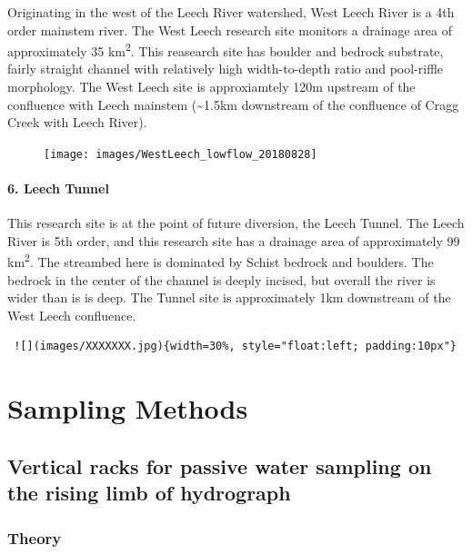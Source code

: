 \documentclass[]{article}
\let\oldparagraph\paragraph
\renewcommand{\paragraph}[1]{\oldparagraph{#1}\mbox{}}
\begin{document}
Originating in the west of the Leech River watershed, West Leech River
is a 4th order mainstem river. The West Leech research site monitors a
drainage area of approximately 35 km\textsuperscript{2}. This reasearch
site has boulder and bedrock substrate, fairly straight channel with
relatively high width-to-depth ratio and pool-riffle morphology. The
West Leech site is approxiamtely 120m upstream of the confluence with
Leech mainstem (\textasciitilde{}1.5km downstream of the confluence of
Cragg Creek with Leech River).

\begin{figure}
\centering
\texttt{[image: images/WestLeech\_lowflow\_20180828]}
\caption{}
\end{figure}

\paragraph{6. Leech Tunnel}\label{leech-tunnel}

This research site is at the point of future diversion, the Leech
Tunnel. The Leech River is 5th order, and this research site has a
drainage area of approximately 99 km\textsuperscript{2}. The streambed
here is dominated by Schist bedrock and boulders. The bedrock in the
center of the channel is deeply incised, but overall the river is wider
than is is deep. The Tunnel site is approximately 1km downstream of the
West Leech confluence.

\begin{verbatim}
 ![](images/XXXXXXX.jpg){width=30%, style="float:left; padding:10px"}
\end{verbatim}

\section{Sampling Methods}\label{sampling-methods}

\subsection{Vertical racks for passive water sampling on the rising limb
of
hydrograph}\label{vertical-racks-for-passive-water-sampling-on-the-rising-limb-of-hydrograph}

\subsubsection{Theory}\label{theory}
\end{document}
